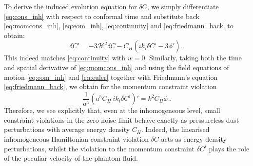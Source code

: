 \documentclass[amsmath,amssymb,11pt]{article}
\begin{document}
To derive the induced evolution equation for $\delta C$, we simply differentiate \eqref{eq:cons_inh} with respect to conformal time and substitute back \eqref{eq:momcons_inh}, \eqref{eq:eom_inh}, \eqref{eq:continuity} and \eqref{eq:friedmann_back} to obtain:
\begin{equation}
    \delta C' = -3 \mathcal{H}^2 \delta C - C_H \left(i k_i \delta C^i -3 \phi' \right) \ .
\end{equation}
This indeed matches \eqref{eq:continuity} with $w=0$. Similarly, taking both the time and spatial derivative of \eqref{eq:momcons_inh} and using the field equations of motion \eqref{eq:eom_inh} and \eqref{eq:euler} together with Friedmann's equation \eqref{eq:friedmann_back}, we obtain for the momentum constraint violation
\begin{equation}
    \frac{1}{a^4}\left(a^5 C_H  \ i k_i \delta C^i \right)'=  k^2 C_H \phi \ .
\end{equation}
Therefore, we see explicitly that, even at the inhomogeneous level, small constraint violations in the zero-noise limit behave exactly as pressureless dust perturbations with average energy density $C_H$. Indeed, the linearised inhomogeneous Hamiltonian constraint violation $\delta C$ acts as energy density perturbations, whilst the violation to the momentum constraint $\delta C^i$ plays the role of the peculiar velocity of the phantom fluid. 
\end{document}
